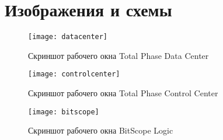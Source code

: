 \section{Изображения и схемы}
\label{app:figures}

\begin{figure}[H]
 \centering
 \texttt{[image: datacenter]}
 \caption{Скриншот рабочего окна Total Phase Data Center}
 \label{fig:datacenter}
\end{figure}

\begin{figure}[H]
 \centering
 \texttt{[image: controlcenter]}
 \caption{Скриншот рабочего окна Total Phase Control Center}
 \label{fig:controlcenter}
\end{figure}

\begin{figure}[H]
 \centering
 \texttt{[image: bitscope]}
 \caption{Скриншот рабочего окна BitScope Logic}
 \label{fig:bitscopelogic}
\end{figure}

